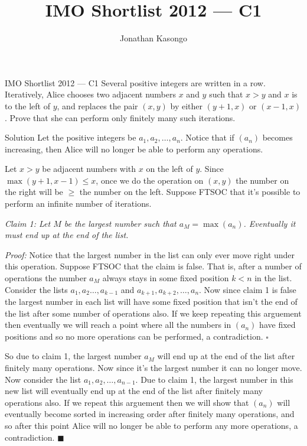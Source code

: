 \documentclass{article}
\author{Jonathan Kasongo}
\title{IMO Shortlist 2012 --- C1}
\begin{document}
\maketitle

\begin{problem}{IMO Shortlist 2012 --- C1}
Several positive integers are written in a row.
Iteratively, Alice chooses two adjacent numbers $x$
and $y$ such that $x > y$ and $x$ is to the left of $y$, and replaces the
pair $(x, y)$ by either $(y + 1, x)$ or
$(x - 1, x)$. Prove that she can perform only finitely many such iterations.
\end{problem}

\begin{solution}{Solution}
Let the positive integers be $a_1, a_2, \ldots, a_n$. Notice that
if $(a_n)$ becomes increasing, then Alice will no longer be able to
perform any operations.\vspace{0.2cm}


Let $x>y$ be adjacent numbers with $x$ on the left of $y$.
Since $\max(y+1, x-1) \leq x$, once we do the operation on $(x,y)$ the
number on the right will be $\geq$ the number on the left. Suppose FTSOC
that it's possible to perform an infinite number of iterations.
\vspace{0.2cm}

\textit{Claim 1: Let $M$ be the largest number such that
$a_M = \max(a_n)$.
Eventually it must end up at the end of the list.}\vspace{0.2cm}

\textit{Proof:}
Notice that the largest number in the list can only ever move right
under this operation. Suppose FTSOC that the claim is false. That is, after
a number of operations the number $a_M$ always stays in some fixed position
$k<n$ in the list. Consider the lists $a_1,a_2 \ldots, a_{k-1}$ and
$a_{k+1}, a_{k+2}, \ldots, a_n$. Now since claim 1 is false the largest
number in each list will have some fixed position that isn't the end
of the list after some number of operations also.
If we keep repeating this arguement then eventually we will reach a point
where all the numbers in $(a_n)$ have fixed positions and so no more
operations can be performed, a contradiction. $\square$ \vspace{0.2cm}

So due to claim 1, the largest number $a_M$ will end up at the end of the list
after finitely many operations. Now since it's the largest number it
can no longer move. Now consider the list $a_1, a_2, \ldots, a_{n-1}$.
Due to claim 1, the largest number in this new list will eventually end up
at the end of the list after finitely many operations also. If we repeat
this arguement then we will show that $(a_n)$ will eventually become sorted
in increasing order after finitely many operations, and so after this point
Alice will no longer be able to perform any more operations, a
contradiction.
$\blacksquare$
\end{solution}
\end{document}
